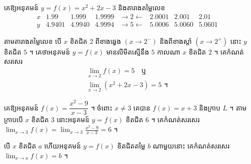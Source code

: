 \begin{example}[ឧទាហរណ៍ ១]
គេឱ្យអនុគមន៍ $y = f(x) = x^2 + 2x - 3$ និងតារាងតម្លៃលេខ
\[
\begin{array}{c|ccccccc}
x & 1.99 & 1.999 & 1.9999 & \to 2 \leftarrow & 2.0001 & 2.001 & 2.01\\ \hline
y & 4.9401 & 4.9940 & 4.9994 & \to 5 \leftarrow & 5.0006 & 5.0060 & 5.0601
\end{array}
\]
\end{example}
តាមតារាងតម្លៃលេខ បើ $x$ ខិតជិត $2$ ពីខាងឆ្វេង $(x \to 2^-)$ និងពីខាងស្ដាំ $(x \to 2^+)$ នោះ $y$ ខិតជិត $5$ ។ គេថាអនុគមន៍ $y = f(x)$ មានលីមីតស្មើនឹង $5$ កាលណា $x$ ខិតជិត $2$ ។ គេកំណត់សរសេរ
\[
\begin{gathered}
\lim_{x \to 2} f(x) = 5 \quad \text{ឬ}\\
\lim_{x \to 2}(x^2 + 2x - 3) = 5 \text{ ។}
\end{gathered}
\]

\begin{example}[ឧទាហរណ៍ ២]
គេឱ្យអនុគមន៍ $f(x) = \dfrac{x^2 - 9}{x - 3}$ ។ ចំពោះ $x \ne 3$ គេបាន $f(x) = x + 3$ និងក្រាប $L$ ។ តាមក្រាបបើ $x$ ខិតជិត $3$ នោះអនុគមន៍ $y = f(x)$ ខិតជិត $6$ ។ គេកំណត់សរសេរ $\displaystyle\lim_{x \to 3} f(x) = \lim_{x \to 3}\frac{x^2 - 9}{x - 3} = 6$ ។
\end{example}

\begin{center}
\end{center}

\begin{formulaBox}[ជាទូទៅ]
បើ $x$ ខិតជិត $a$ ហើយអនុគមន៍ $y = f(x)$ ខិតជិតតម្លៃ $b$ ណាមួយនោះ គេកំណត់សរសេរ $\displaystyle\lim_{x \to a} f(x) = b$ ។
\end{formulaBox}


